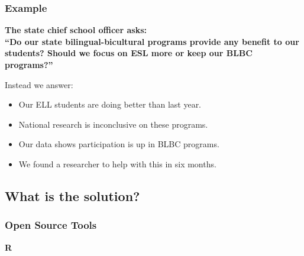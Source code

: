 \documentclass{beamer}
\begin{document}
\begin{frame}
\frametitle{Example}
\begin{center}
\textbf{The state chief school officer asks: \\ 
``Do our state bilingual-bicultural programs provide any benefit to our students? Should we focus on ESL more or keep our BLBC programs?''}
\end{center}
\vspace{.1in}
Instead we answer:
\begin{itemize}
  \item Our ELL students are doing better than last year.
  \item National research is inconclusive on these programs.
  \item Our data shows participation is up in BLBC programs.
  \item We found a researcher to help with this in six months.
\end{itemize}
\end{frame}


\subsection{What is the solution?}

{
\begin{frame}[plain]
\frametitle{Open Source Tools}
\vspace{.3in}
\begin{center}
\Huge \textbf{R}
\end{center}
\end{frame}
}
\end{document}
